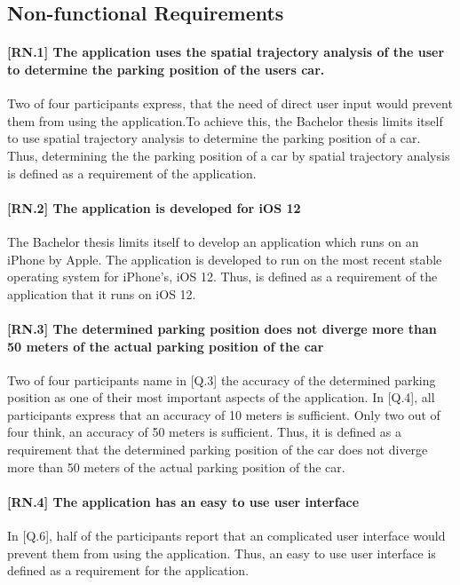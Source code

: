 \subsection{Non-functional Requirements}

\paragraph{[RN.1] The application uses the spatial trajectory analysis of the user to determine the parking position of the users car.}
Two of four participants express, that the need of direct user input would prevent them from using the application.To achieve this, the Bachelor thesis limits itself to use spatial trajectory analysis to determine the parking position of a car. Thus, determining the the parking position of a car by spatial trajectory analysis is defined as a requirement of the application.

\paragraph{[RN.2] The application is developed for iOS 12}
The Bachelor thesis limits itself to develop an application which runs on an iPhone by Apple. The application is developed to run on the most recent stable operating system for iPhone's, iOS 12. Thus, is defined as a requirement of the application that it runs on iOS 12.

\paragraph{[RN.3] The determined parking position does not diverge more than 50 meters of the actual parking position of the car}
Two of four participants name in [Q.3] the accuracy of the determined parking position as one of their most important aspects of the application. In [Q.4], all participants express that an accuracy of 10 meters is sufficient. Only two out of four think, an accuracy of 50 meters is sufficient. Thus, it is defined as a requirement that the determined parking position of the car does not diverge more than 50 meters of the actual parking position of the car.


\paragraph{[RN.4] The application has an easy to use user interface}
In [Q.6], half of the participants report that an complicated user interface would prevent them from using the application. Thus, an easy to use user interface is defined as a requirement for the application.

